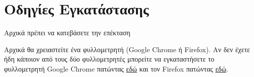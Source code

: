 \documentclass{article}
\begin{document}
\section*{Οδηγίες Εγκατάστασης}

Αρχικά πρέπει να κατεβάσετε την επέκταση


Αρχικά θα χρειαστείτε ένα φυλλομετρητή (Google Chrome ή Firefox). Αν δεν έχετε ήδη κάποιον από τους δύο φυλλομετρητές μπορείτε να εγκαταστήσετε το φυλλομετρητή Google Chrome πατώντας \href{https://www.google.com/intl/en_uk/chrome/dr/download/?brand=JJTC&gclid=Cj0KCQjwtsCgBhDEARIsAE7RYh0p-X2d7kNkVFLPkWmugeV2VobmgNNGBRYp2fAA-5cahaJSEYdx50AaAlgwEALw_wcB&gclsrc=aw.ds}{εδώ} και τον Firefox πατώντας \href{https://www.mozilla.org/en-GB/firefox/new/}{εδώ}.
\end{document}
